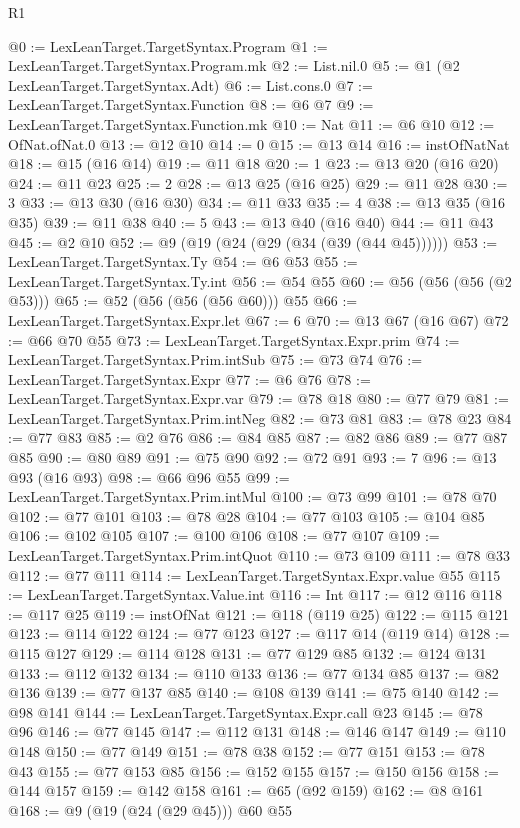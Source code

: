 \begin{lexlean}{R1}
\begin{coremodule}
{{{{{{{@0 := LexLeanTarget.TargetSyntax.Program
@1 := LexLeanTarget.TargetSyntax.Program.mk
@2 := List.nil.{0}
@5 := @1 (@2 LexLeanTarget.TargetSyntax.Adt)
@6 := List.cons.{0}
@7 := LexLeanTarget.TargetSyntax.Function
@8 := @6 @7
@9 := LexLeanTarget.TargetSyntax.Function.mk
@10 := Nat
@11 := @6 @10
@12 := OfNat.ofNat.{0}
@13 := @12 @10
@14 := 0
@15 := @13 @14
@16 := instOfNatNat
@18 := @15 (@16 @14)
@19 := @11 @18
@20 := 1
@23 := @13 @20 (@16 @20)
@24 := @11 @23
@25 := 2
@28 := @13 @25 (@16 @25)
@29 := @11 @28
@30 := 3
@33 := @13 @30 (@16 @30)
@34 := @11 @33
@35 := 4
@38 := @13 @35 (@16 @35)
@39 := @11 @38
@40 := 5
@43 := @13 @40 (@16 @40)
@44 := @11 @43
@45 := @2 @10
@52 := @9 (@19 (@24 (@29 (@34 (@39 (@44 @45))))))
@53 := LexLeanTarget.TargetSyntax.Ty
@54 := @6 @53
@55 := LexLeanTarget.TargetSyntax.Ty.int
@56 := @54 @55
@60 := @56 (@56 (@56 (@2 @53)))
@65 := @52 (@56 (@56 (@56 @60))) @55
@66 := LexLeanTarget.TargetSyntax.Expr.let
@67 := 6
@70 := @13 @67 (@16 @67)
@72 := @66 @70 @55
@73 := LexLeanTarget.TargetSyntax.Expr.prim
@74 := LexLeanTarget.TargetSyntax.Prim.intSub
@75 := @73 @74
@76 := LexLeanTarget.TargetSyntax.Expr
@77 := @6 @76
@78 := LexLeanTarget.TargetSyntax.Expr.var
@79 := @78 @18
@80 := @77 @79
@81 := LexLeanTarget.TargetSyntax.Prim.intNeg
@82 := @73 @81
@83 := @78 @23
@84 := @77 @83
@85 := @2 @76
@86 := @84 @85
@87 := @82 @86
@89 := @77 @87 @85
@90 := @80 @89
@91 := @75 @90
@92 := @72 @91
@93 := 7
@96 := @13 @93 (@16 @93)
@98 := @66 @96 @55
@99 := LexLeanTarget.TargetSyntax.Prim.intMul
@100 := @73 @99
@101 := @78 @70
@102 := @77 @101
@103 := @78 @28
@104 := @77 @103
@105 := @104 @85
@106 := @102 @105
@107 := @100 @106
@108 := @77 @107
@109 := LexLeanTarget.TargetSyntax.Prim.intQuot
@110 := @73 @109
@111 := @78 @33
@112 := @77 @111
@114 := LexLeanTarget.TargetSyntax.Expr.value @55
@115 := LexLeanTarget.TargetSyntax.Value.int
@116 := Int
@117 := @12 @116
@118 := @117 @25
@119 := instOfNat
@121 := @118 (@119 @25)
@122 := @115 @121
@123 := @114 @122
@124 := @77 @123
@127 := @117 @14 (@119 @14)
@128 := @115 @127
@129 := @114 @128
@131 := @77 @129 @85
@132 := @124 @131
@133 := @112 @132
@134 := @110 @133
@136 := @77 @134 @85
@137 := @82 @136
@139 := @77 @137 @85
@140 := @108 @139
@141 := @75 @140
@142 := @98 @141
@144 := LexLeanTarget.TargetSyntax.Expr.call @23
@145 := @78 @96
@146 := @77 @145
@147 := @112 @131
@148 := @146 @147
@149 := @110 @148
@150 := @77 @149
@151 := @78 @38
@152 := @77 @151
@153 := @78 @43
@155 := @77 @153 @85
@156 := @152 @155
@157 := @150 @156
@158 := @144 @157
@159 := @142 @158
@161 := @65 (@92 @159)
@162 := @8 @161
@168 := @9 (@19 (@24 (@29 @45))) @60 @55
}}}}}}}
\end{coremodule}
\end{lexlean}
